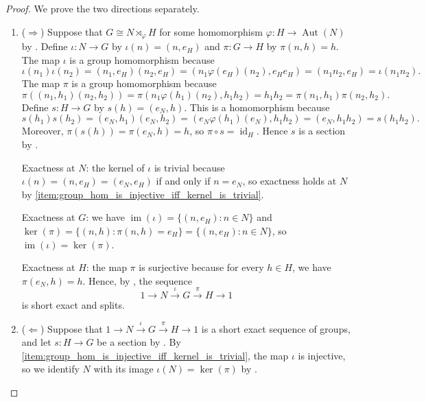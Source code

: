 \begin{proof}
    We prove the two directions separately.

    \begin{enumerate}
        \item ($\Rightarrow$) Suppose that $G \cong N \rtimes_\varphi H$ for some homomorphism $\varphi: H \to \operatorname{Aut}(N)$ by . Define $\iota: N \to G$ by $\iota(n) = (n, e_H)$ and $\pi: G \to H$ by $\pi(n, h) = h$. The map $\iota$ is a group homomorphism because
        $$\iota(n_1)\iota(n_2) = (n_1, e_H)(n_2, e_H) = (n_1\varphi(e_H)(n_2), e_He_H) = (n_1n_2, e_H) = \iota(n_1n_2).$$
        The map $\pi$ is a group homomorphism because
        $$\pi((n_1,h_1)(n_2,h_2)) = \pi(n_1\varphi(h_1)(n_2), h_1h_2) = h_1h_2 = \pi(n_1,h_1)\pi(n_2,h_2).$$
        Define $s: H \to G$ by $s(h) = (e_N, h)$. This is a homomorphism because
        $$s(h_1)s(h_2) = (e_N, h_1)(e_N, h_2) = (e_N\varphi(h_1)(e_N), h_1h_2) = (e_N, h_1h_2) = s(h_1h_2).$$
        Moreover, $\pi(s(h)) = \pi(e_N, h) = h$, so $\pi \circ s = \operatorname{id}_H$. Hence $s$ is a section by .

        Exactness at $N$: the kernel of $\iota$ is trivial because $\iota(n) = (n, e_H) = (e_N, e_H)$ if and only if $n = e_N$, so exactness holds at $N$ by \eqref{item:group_hom_is_injective_iff_kernel_is_trivial}.

        Exactness at $G$: we have $\operatorname{im}(\iota) = \{(n, e_H) : n \in N\}$ and $\ker(\pi) = \{(n, h) : \pi(n,h) = e_H\} = \{(n, e_H) : n \in N\}$, so $\operatorname{im}(\iota) = \ker(\pi)$.

        Exactness at $H$: the map $\pi$ is surjective because for every $h \in H$, we have $\pi(e_N, h) = h$. Hence, by , the sequence
        $$1 \longrightarrow N \xrightarrow{\iota} G \xrightarrow{\pi} H \longrightarrow 1$$
        is short exact and splits.

        \item ($\Leftarrow$) Suppose that $1 \to N \xrightarrow{\iota} G \xrightarrow{\pi} H \to 1$ is a short exact sequence of groups, and let $s: H \to G$ be a section by . By \eqref{item:group_hom_is_injective_iff_kernel_is_trivial}, the map $\iota$ is injective, so we identify $N$ with its image $\iota(N) = \ker(\pi)$ by .


\end{enumerate}
\end{proof}
